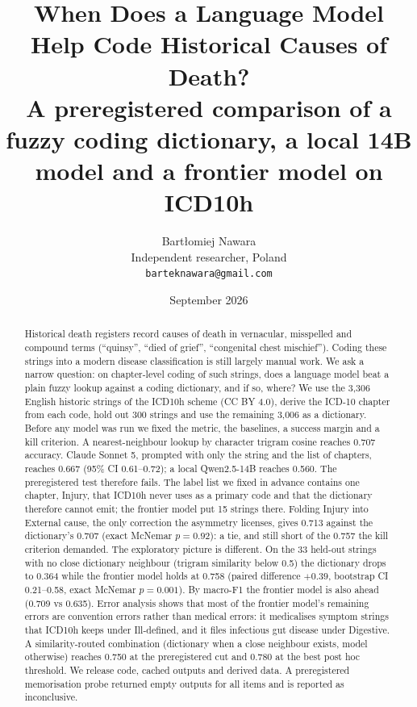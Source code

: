 \documentclass[11pt]{article}
\title{When Does a Language Model Help Code Historical Causes of Death?\\
\large A preregistered comparison of a fuzzy coding dictionary, a local 14B model and a frontier model on ICD10h}
\author{Bart{\l}omiej Nawara\\
Independent researcher, Poland\\
\texttt{barteknawara@gmail.com}}
\date{September 2026}
\begin{document}
\maketitle

\begin{abstract}
Historical death registers record causes of death in vernacular, misspelled and compound terms (``quinsy'', ``died of grief'', ``congenital chest mischief''). Coding these strings into a modern disease classification is still largely manual work. We ask a narrow question: on chapter-level coding of such strings, does a language model beat a plain fuzzy lookup against a coding dictionary, and if so, where? We use the 3,306 English historic strings of the ICD10h scheme (CC BY 4.0), derive the ICD-10 chapter from each code, hold out 300 strings and use the remaining 3,006 as a dictionary. Before any model was run we fixed the metric, the baselines, a success margin and a kill criterion. A nearest-neighbour lookup by character trigram cosine reaches 0.707 accuracy. Claude Sonnet 5, prompted with only the string and the list of chapters, reaches 0.667 (95\% CI 0.61--0.72); a local Qwen2.5-14B reaches 0.560. The preregistered test therefore fails. The label list we fixed in advance contains one chapter, Injury, that ICD10h never uses as a primary code and that the dictionary therefore cannot emit; the frontier model put 15 strings there. Folding Injury into External cause, the only correction the asymmetry licenses, gives 0.713 against the dictionary's 0.707 (exact McNemar $p=0.92$): a tie, and still short of the 0.757 the kill criterion demanded. The exploratory picture is different. On the 33 held-out strings with no close dictionary neighbour (trigram similarity below 0.5) the dictionary drops to 0.364 while the frontier model holds at 0.758 (paired difference $+0.39$, bootstrap CI 0.21--0.58, exact McNemar $p=0.001$). By macro-F1 the frontier model is also ahead (0.709 vs 0.635). Error analysis shows that most of the frontier model's remaining errors are convention errors rather than medical errors: it medicalises symptom strings that ICD10h keeps under Ill-defined, and it files infectious gut disease under Digestive. A similarity-routed combination (dictionary when a close neighbour exists, model otherwise) reaches 0.750 at the preregistered cut and 0.780 at the best post hoc threshold. We release code, cached outputs and derived data. A preregistered memorisation probe returned empty outputs for all items and is reported as inconclusive.
\end{abstract}
\end{document}

